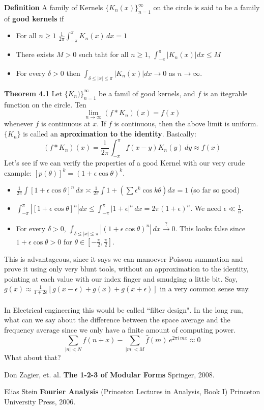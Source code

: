\documentclass[12pt]{article}
\begin{document}
\textbf{Definition} A family of Kernels $\{ K_n(x) \}_{n=1}^\infty$ on the circle is said to be a family of \textbf{good kernels} if
\begin{itemize}
\item For all $n \geq 1$ $\displaystyle \frac{1}{2\pi} \int_{-\pi}^\pi K_n(x) \, dx = 1$
\item There exists $M > 0$ such taht for all $n \geq 1$, $\displaystyle \int_{-\pi}^\pi |K_n(x) | dx \leq M $
\item For every $\delta > 0$ then $\displaystyle \int_{\delta \leq |x| \leq \pi } |K_n(x) | dx \to 0 $ as $n \to \infty$.
\end{itemize}
\textbf{Theorem 4.1} Let $\{ K_n)\}_{n=1}^\infty$ be a famil of good kernels, and $f$ is an itegrable function on the circle.  Ten
$$ \lim_{n \to \infty} (f \ast K_n)(x) = f(x) $$
whenever $f$ is continuous at $x$.  If $f$ is continuous, then the above limit is uniform.  $\{K_n\}$ is called an \textbf{aproximation to the identity}.  Basically:
$$ ( f \ast K_n)(x) = \frac{1}{2\pi} \int_{-\pi}^\pi f(x-y) K_n(y) \, dy \approx f(x) $$
Let's see if we can verify the properties of a good Kernel with our very crude example: $[p(\theta)]^k = (1 + \epsilon \cos \theta)^k$.
\begin{itemize}
\item $\frac{1}{2\pi} \int [1 + \epsilon \cos \theta]^n \, dx \asymp \frac{1}{2\pi}\int 1 + (\sum \epsilon^k \cos k \theta)dx = 1 $ (so far so good)
\item $\int_{-\pi}^\pi |[1 + \epsilon \cos \theta]^n|dx
\leq \int_{-\pi}^{\pi} |1 + \epsilon|^n \, dx = 2\pi (1 + \epsilon)^n $.  We need $\epsilon \ll \frac{1}{n}$.
\item For every $\delta > 0$, $\displaystyle \int_{\delta \leq |x| \leq \pi} |(1 + \epsilon \cos \theta)^n | \, dx \stackrel{?}{\to} 0 $. This looks false since $1 + \epsilon \cos \theta > 0$ for $\theta \in [-\frac{\pi}{2}, \frac{\pi}{2}]$.  
\end{itemize}
This is advantageous, since it says we can manoever Poisson summation and prove it using only very blunt tools, without an approximation to the identity, pointing at each value with our index finger and smudging a little bit.  Say, $g(x) \approx \frac{1}{1 + 2\epsilon}[g(x-\epsilon) + g(x) + g(x + \epsilon) ]$ in a very common sense way. \\ \\
In Electrical engineering this would be called ``filter design".  In the long run, what can we say about the difference between the space average and the frequency average since we only have a finite amount of computing power.
$$ \sum_{|n| < N} f(n + x) - \sum_{ |m| < M} \hat{f}(m) \, e^{2\pi i \, m x} \approx 0 $$
What about that?
\vfill

\begin{thebibliography}{}

\item Don Zagier, et. al. \textbf{The 1-2-3 of Modular Forms} Springer, 2008.
\item Elias Stein \textbf{Fourier Analysis} (Princeton Lectures in Analysis, Book I) Princeton University Press, 2006.
\end{thebibliography}
\end{document}
